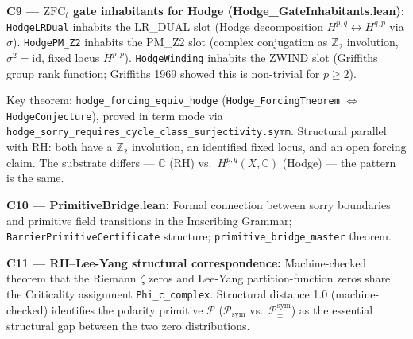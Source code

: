 \documentclass[12pt,a4paper]{article}
\begin{document}
\textbf{C9 --- $\mathrm{ZFC}_t$ gate inhabitants for Hodge (Hodge\_GateInhabitants.lean):} \texttt{HodgeLRDual} inhabits the LR\_DUAL slot (Hodge decomposition $H^{p,q} \leftrightarrow H^{q,p}$ via $\sigma$). \texttt{HodgePM\_Z2} inhabits the PM\_Z2 slot (complex conjugation as $\mathbb{Z}_2$ involution, $\sigma^2 = \mathrm{id}$, fixed locus $H^{p,p}$). \texttt{HodgeWinding} inhabits the ZWIND slot (Griffiths group rank function; Griffiths 1969 showed this is non-trivial for $p \geq 2$).

Key theorem: \texttt{hodge\_forcing\_equiv\_hodge} (\texttt{Hodge\_ForcingTheorem} $\iff$ \texttt{HodgeConjecture}), proved in term mode via \texttt{hodge\_sorry\_requires\_cycle\_class\_surjectivity.symm}. Structural parallel with RH: both have a $\mathbb{Z}_2$ involution, an identified fixed locus, and an open forcing claim. The substrate differs --- $\mathbb{C}$ (RH) vs.\ $H^{p,q}(X, \mathbb{C})$ (Hodge) --- the pattern is the same.

\textbf{C10 --- PrimitiveBridge.lean:} Formal connection between sorry boundaries and primitive field transitions in the Imscribing Grammar; \texttt{BarrierPrimitiveCertificate} structure; \texttt{primitive\_bridge\_master} theorem.

\textbf{C11 --- RH--Lee-Yang structural correspondence:} Machine-checked theorem that the Riemann $\zeta$ zeros and Lee-Yang partition-function zeros share the Criticality assignment \texttt{Phi\_c\_complex}. Structural distance 1.0 (machine-checked) identifies the polarity primitive $\mathcal{P}$ ($\mathcal{P}_\text{sym}$ vs.\ $\mathcal{P}_{\pm}^\text{sym}$) as the essential structural gap between the two zero distributions.
\end{document}
